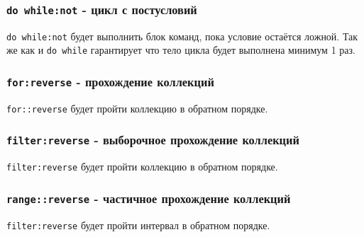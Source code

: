 \subsubsection{\lstinline|do while:not| - цикл с постусловий}

\lstinline|do while:not| будет выполнить блок команд, пока условие остаётся ложной. Так же как и \lstinline|do while| гарантирует что тело цикла будет выполнена минимум 1 раз.

\subsubsection{\lstinline|for:reverse| - прохождение коллекций}

\lstinline|for::reverse| будет пройти коллекцию в обратном порядке.

\subsubsection{\lstinline|filter:reverse| - выборочное прохождение коллекций}

\lstinline|filter:reverse| будет пройти коллекцию в обратном порядке.

\subsubsection{\lstinline|range::reverse| - частичное прохождение коллекций}

\lstinline|filter:reverse| будет пройти интервал в обратном порядке.
